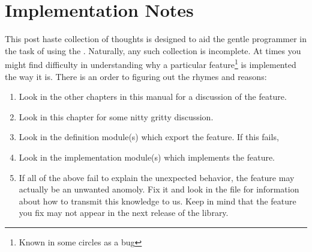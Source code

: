 %
%
%
%

\chapter{Implementation Notes}


This post haste collection of thoughts is designed to aid the
gentle programmer in the task of using the \library.  Naturally,
any such collection is incomplete.  At times you might find 
difficulty in understanding why a particular feature\footnote{
    Known in some circles as a bug} 
is implemented the way it is.  There is an order to figuring
out the rhymes and reasons:
\begin{enumerate}
\item
    Look in the other chapters in this manual for a discussion
    of the feature.
\item
    Look in this chapter for some nitty gritty discussion.
\item
    Look in the definition module(s) which export the feature.
    If this fails,
\item
    Look in the implementation module(s) which implements the feature.
\item
    If all of the above fail to explain the unexpected behavior, 
    the feature may actually be an unwanted anomoly.  
    Fix it and look in the  file for information
    about how to transmit this knowledge to us.
    Keep in mind that the feature you fix may not appear in
    the next release of the library.
\end{enumerate}


